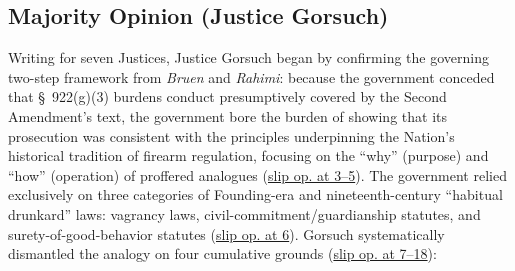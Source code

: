 \documentclass[12pt]{article}
\begin{document}
\subsection{Majority Opinion (Justice Gorsuch)}

Writing for seven Justices, Justice Gorsuch began by confirming the governing two-step framework from \textit{Bruen} and \textit{Rahimi}: because the government conceded that \S~922(g)(3) burdens conduct presumptively covered by the Second Amendment's text, the government bore the burden of showing that its prosecution was consistent with the principles underpinning the Nation's historical tradition of firearm regulation, focusing on the ``why'' (purpose) and ``how'' (operation) of proffered analogues (\href{https://supreme.justia.com/cases/federal/us/608/24-1234/}{slip op. at 3--5}). The government relied exclusively on three categories of Founding-era and nineteenth-century ``habitual drunkard'' laws: vagrancy laws, civil-commitment/guardianship statutes, and surety-of-good-behavior statutes (\href{https://supreme.justia.com/cases/federal/us/608/24-1234/}{slip op. at 6}). Gorsuch systematically dismantled the analogy on four cumulative grounds (\href{https://supreme.justia.com/cases/federal/us/608/24-1234/}{slip op. at 7--18}):
\end{document}
